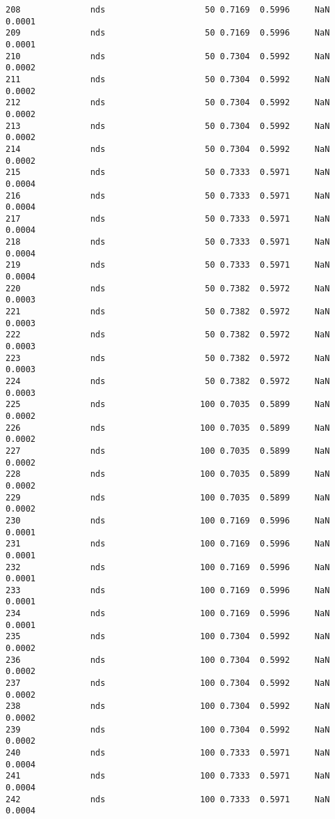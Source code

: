 \documentclass[11pt]{article}
\begin{document}
\begin{Verbatim}[commandchars=\\\{\}]
208              nds                    50 0.7169  0.5996     NaN 0.0001   
209              nds                    50 0.7169  0.5996     NaN 0.0001   
210              nds                    50 0.7304  0.5992     NaN 0.0002   
211              nds                    50 0.7304  0.5992     NaN 0.0002   
212              nds                    50 0.7304  0.5992     NaN 0.0002   
213              nds                    50 0.7304  0.5992     NaN 0.0002   
214              nds                    50 0.7304  0.5992     NaN 0.0002   
215              nds                    50 0.7333  0.5971     NaN 0.0004   
216              nds                    50 0.7333  0.5971     NaN 0.0004   
217              nds                    50 0.7333  0.5971     NaN 0.0004   
218              nds                    50 0.7333  0.5971     NaN 0.0004   
219              nds                    50 0.7333  0.5971     NaN 0.0004   
220              nds                    50 0.7382  0.5972     NaN 0.0003   
221              nds                    50 0.7382  0.5972     NaN 0.0003   
222              nds                    50 0.7382  0.5972     NaN 0.0003   
223              nds                    50 0.7382  0.5972     NaN 0.0003   
224              nds                    50 0.7382  0.5972     NaN 0.0003   
225              nds                   100 0.7035  0.5899     NaN 0.0002   
226              nds                   100 0.7035  0.5899     NaN 0.0002   
227              nds                   100 0.7035  0.5899     NaN 0.0002   
228              nds                   100 0.7035  0.5899     NaN 0.0002   
229              nds                   100 0.7035  0.5899     NaN 0.0002   
230              nds                   100 0.7169  0.5996     NaN 0.0001   
231              nds                   100 0.7169  0.5996     NaN 0.0001   
232              nds                   100 0.7169  0.5996     NaN 0.0001   
233              nds                   100 0.7169  0.5996     NaN 0.0001   
234              nds                   100 0.7169  0.5996     NaN 0.0001   
235              nds                   100 0.7304  0.5992     NaN 0.0002   
236              nds                   100 0.7304  0.5992     NaN 0.0002   
237              nds                   100 0.7304  0.5992     NaN 0.0002   
238              nds                   100 0.7304  0.5992     NaN 0.0002   
239              nds                   100 0.7304  0.5992     NaN 0.0002   
240              nds                   100 0.7333  0.5971     NaN 0.0004   
241              nds                   100 0.7333  0.5971     NaN 0.0004   
242              nds                   100 0.7333  0.5971     NaN 0.0004   

\end{Verbatim}
\end{document}
